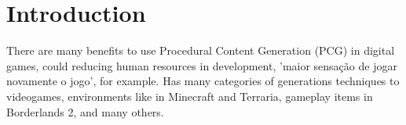 \section{Introduction}

There are many benefits to use Procedural Content Generation (PCG) in digital games, could reducing human resources in development, 'maior sensação de jogar novamente o jogo', for example. Has many categories of generations techniques to videogames, environments like in Minecraft and Terraria, gameplay items in Borderlands 2, and many others.